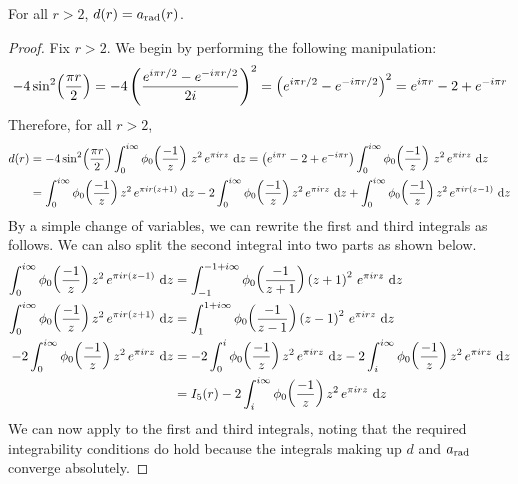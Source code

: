 \begin{boxproposition}
    For all $r > 2$, $d(r) = a_{\operatorname{rad}}(r)$.
\end{boxproposition}
\begin{proof}
    Fix $r > 2$. We begin by performing the following manipulation:
    \begin{align*}
        -4 \sin^2\!\left( \frac{\pi r}{2} \right)
        = -4 \left( \frac{e^{i \pi r / 2} - e^{-i \pi r / 2}}{2i} \right)^2
        = \left( e^{i \pi r / 2} - e^{- i \pi r / 2} \right)^2
        = e^{i \pi r} - 2 + e^{-i \pi r}
    \end{align*}
    Therefore, for all $r > 2$,
    \begin{align*}
        d(r)
        &= -4 \sinsq{\frac{\pi r}{2}} \int_{0}^{i \infty} \phi_0\of{\frac{-1}{z}} \, z^2 \, e^{\pi i r z} \, \diff{z}
        = \parenth{e^{i \pi r} - 2 + e^{-i \pi r}} \int_{0}^{i \infty} \phi_0\of{\frac{-1}{z}} \, z^2 \, e^{\pi i r z} \, \diff{z} \\
        &= \int_{0}^{i \infty} \phi_0\of{\frac{-1}{z}} z^2 \, e^{\pi i r \parenth{z + 1}} \, \diff{z}
        -2 \int_{0}^{i \infty} \phi_0\of{\frac{-1}{z}} z^2 \, e^{\pi i r z} \, \diff{z}
        + \int_{0}^{i \infty} \phi_0\of{\frac{-1}{z}} z^2 \, e^{\pi i r \parenth{z - 1}} \, \diff{z}
    \end{align*}
    By a simple change of variables, we can rewrite the first and third integrals as follows. We can also split the second integral into two parts as shown below.
    \begin{align*}
        \int_{0}^{i \infty} \phi_0\of{\frac{-1}{z}} z^2 \, e^{\pi i r \parenth{z - 1}} \, \diff{z}
        &=
        \int_{-1}^{-1 + i \infty} \phi_0\of{\frac{-1}{z + 1}} \parenth{z + 1}^2 \, e^{\pi i r z} \, \diff{z} \\
        \int_{0}^{i \infty} \phi_0\of{\frac{-1}{z}} z^2 \, e^{\pi i r \parenth{z + 1}} \, \diff{z}
        &=
        \int_{1}^{1 + i \infty} \phi_0\of{\frac{-1}{z - 1}} \parenth{z - 1}^2 \, e^{\pi i r z} \, \diff{z} \\
        -2 \int_{0}^{i \infty} \phi_0\of{\frac{-1}{z}} z^2 \, e^{\pi i r z} \, \diff{z}
        &=
        -2 \int_{0}^{i} \phi_0\of{\frac{-1}{z}} z^2 \, e^{\pi i r z} \, \diff{z}
        -2 \int_{i}^{i \infty} \phi_0\of{\frac{-1}{z}} z^2 \, e^{\pi i r z} \, \diff{z} \\
        &= I_5(r) - 2\int_{i}^{i \infty} \phi_0\of{\frac{-1}{z}} z^2 \, e^{\pi i r z} \, \diff{z}
    \end{align*}
    We can now apply  to the first and third integrals, noting that the required integrability conditions do hold because the integrals making up $d$ and $a_{\operatorname{rad}}$ converge absolutely.

\end{proof}
